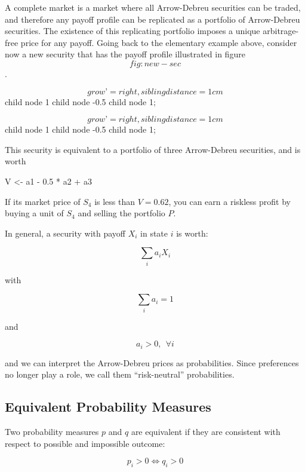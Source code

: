 \documentclass[justified]{tufte-book}
\newenvironment{Shaded}{}{}
\newcommand{\FloatTok}[1]{\textcolor[rgb]{0.25,0.63,0.44}{#1}}
\newcommand{\NormalTok}[1]{#1}
\newcommand{\OperatorTok}[1]{\textcolor[rgb]{0.40,0.40,0.40}{#1}}
\newcommand{\StringTok}[1]{\textcolor[rgb]{0.25,0.44,0.63}{#1}}
\begin{document}
A complete market is a market where all Arrow-Debreu securities can be
traded, and therefore any payoff profile can be replicated as a
portfolio of Arrow-Debreu securities. The existence of this replicating
portfolio imposes a unique arbitrage-free price for any payoff. Going
back to the elementary example above, consider now a new security that
has the payoff profile illustrated in figure~\[fig:new-sec\].

\[grow’=right,sibling distance=1cm\] child {node {1}} child {node
{-0.5}} child {node {1}};

\[grow’=right,sibling distance=1cm\] child {node {1}} child {node
{-0.5}} child {node {1}};

This security is equivalent to a portfolio of three Arrow-Debreu
securities, and is worth

\begin{Shaded}
\begin{Highlighting}[]
\NormalTok{V \textless{}{-}}\StringTok{ }\NormalTok{a1 }\OperatorTok{{-}}\StringTok{ }\FloatTok{0.5} \OperatorTok{*}\StringTok{ }\NormalTok{a2 }\OperatorTok{+}\StringTok{ }\NormalTok{a3}
\end{Highlighting}
\end{Shaded}

If its market price of \(S_4\) is less than \(V=0.62\), you
can earn a riskless profit by buying a unit of \(S_4\) and selling the
portfolio \(P\).

In general, a security with payoff \(X_i\) in state \(i\) is worth:

\[\sum_i a_i X_i\]

with

\[\sum_i a_i = 1\]

and

\[a_i >0, \ \ \forall i\]

and we can interpret the Arrow-Debreu prices as probabilities. Since
preferences no longer play a role, we call them ``risk-neutral''
probabilities.

\hypertarget{equivalent-probability-measures}{%
\subsection{Equivalent Probability Measures}\label{equivalent-probability-measures}}

Two probability measures \(p\) and \(q\) are equivalent if they are
consistent with respect to possible and impossible outcome:

\[p_i >0 \Leftrightarrow q_i >0\]
\end{document}
